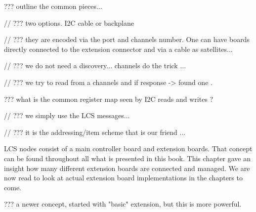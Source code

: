 ??? outline the common pieces...



// ??? two options. I2C cable or backplane

// ??? they are encoded via the port and channels number. One can have boards directly connected to the extension connector and via a cable as satellites...



// ??? we do not need a discovery... channels do the trick ... 

// ??? we try to read from a channels and if response -> found one .



??? what is the common register map seen by I2C reads and writes ?


// ??? we simply use the LCS messages... 

// ??? it is the addressing/item scheme that is our friend ... 









LCS nodes consist of a main controller board and extension boards. That concept can be found throughout all what is presented in this book. This chapter gave an insight how many different extension boards are connected and managed. We are now read to look at actual extension board implementations in the chapters to come.


??? a newer concept, started with "basic" extension, but this is more powerful.



